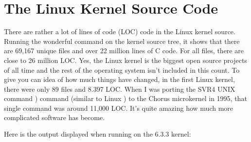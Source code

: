 \chapter{The Linux Kernel Source Code}

There are rather a lot of lines of code (LOC) code in the Linux kernel source. Running the wonderful  command on the  kernel source tree, it shows that there are 69,167 unique files and over 22 million lines of C code. For all files, there are close to 26 million LOC. Yes, the Linux kernel is the biggest open source projects of all time and the rest of the operating system isn't included in this count. To give you can idea of how much things have changed, in the first Linux kernel, there were only 89 files and 8.397 LOC. When I was porting the SVR4 UNIX command ) command (similar to Linux ) to the Chorus microkernel in 1995, that single command was around 11,000 LOC. It's quite amazing how much more complicated software has become.

Here is the output displayed when running  on the 6.3.3 kernel:
 
